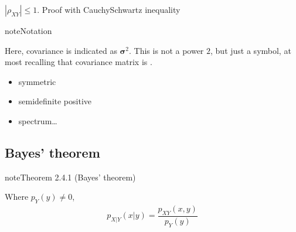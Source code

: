 \documentclass[letterpaper,10pt,english]{jupyterBook}
\begin{document}
\sphinxAtStartPar
{} \(|\rho_{XY}| \le 1\). Proof with Cauchy\sphinxhyphen{}Schwartz inequality 

\begin{sphinxadmonition}{note}{Notation}

\sphinxAtStartPar
Here, covariance is indicated as \(\boldsymbol{\sigma}^2\). This is not a power \(2\), but just a symbol, at most recalling that covariance matrix is .
\end{sphinxadmonition}

\sphinxAtStartPar
{}
\begin{itemize}
\item {} 
\sphinxAtStartPar
symmetric

\item {} 
\sphinxAtStartPar
semi\sphinxhyphen{}definite positive

\item {} 
\sphinxAtStartPar
spectrum…

\end{itemize}


\subsection{Bayes’ theorem}
\label{\detokenize{ch/prob/rv-multi-dimensional:bayes-theorem}}\label{\detokenize{ch/prob/rv-multi-dimensional:prob-multidim-bayes}}\label{ch/prob/rv-multi-dimensional:theorem-1}
\begin{sphinxadmonition}{note}{Theorem 2.4.1 (Bayes’ theorem)}



\sphinxAtStartPar
Where \(p_Y(y) \ne 0\),
\begin{equation*}
\begin{split}p_{X|Y}(x|y) = \dfrac{p_{XY}(x,y)}{p_Y(y)}\end{split}
\end{equation*}\end{sphinxadmonition}
\end{document}
